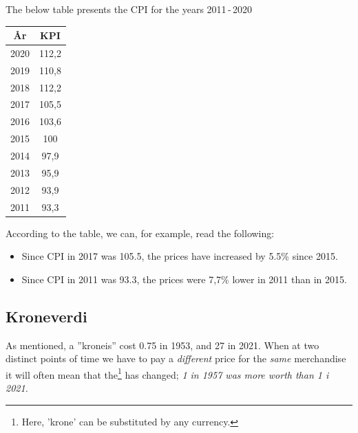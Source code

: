 The below table presents the CPI for the  years 2011\,-\,2020
\begin{center}
	\begin{tabular}{c|c}
		År &  KPI \\ \hline
		2020 & 112,2\\
		2019 & 	110,8\\
		2018 &  112,2 \\
		2017&	105,5\\
		2016&	103,6\\
		2015&	100\\
		2014&	97,9\\
		2013&	95,9\\
		2012&	93,9\\
		2011&	93,3\\
	\end{tabular}
\end{center}
According to the table, we can, for example, read the following:
\begin{itemize}
	\item Since CPI in 2017 was 105.5, the prices have increased by 5.5\% since 2015.
	\item Since CPI in 2011 was 93.3, the prices were 7,7\% lower in 2011 than in 2015.
\end{itemize}
\newpage
{}
\subsection{Kroneverdi}
As mentioned, a ''kroneis'' cost 0.75 in 1953, and 27 in 2021. When at two distinct points of time we have to pay a \textsl{different} price for the \textsl{same} merchandise it will often mean that the\footnote{Here, 'krone' can be substituted by any currency.}  has changed;\textsl{ 1 in 1957 was more worth than 1 i 2021.
}\vsk

